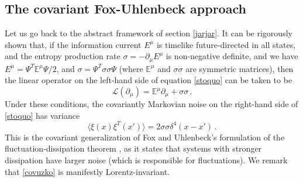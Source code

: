 \documentclass[aps,prd,preprint,nofootinbib,amsmath,amssymb,showpacs,longbibliography,singlecolumn,superscriptaddress,10pt]{revtex4-1}
\theoremstyle{plain}
\theoremstyle{definition}
\begin{document}
\subsection{The covariant Fox-Uhlenbeck approach}

Let us go back to the abstract framework of section \ref{jarjar}. It can be rigorously shown \cite{Gavassino:2023odx,Gavassino:2023qwl} that, if the information current $E^\mu$ is timelike future-directed in all states, and the entropy production rate $\sigma=-\partial_\mu E^\mu$ is non-negative definite, and we have $E^\mu = \Psi^T \mathbb{E}^\mu \Psi/2$, and $\sigma=\Psi^T \sigma \! \! \! \sigma \Psi$ (where $\mathbb{E}^\mu$ and $\sigma \! \! \! \sigma$ are symmetric matrices), then the linear operator on the left-hand side of equation \eqref{stoquo} can be taken to be 
\begin{equation}
   \mathcal{L}(\partial_\mu)=\mathbb{E}^\mu \partial_\mu + \sigma \! \! \! \sigma \, . 
\end{equation}
Under these conditions, the covariantly Markovian noise on the right-hand side of \eqref{stoquo} has variance \cite{Mullins:2023tjg, Mullins:2023ott}
\begin{equation}\label{covuzko}
    \langle \xi(x) \xi^T(x')\rangle = 2 \sigma \! \! \! \sigma \delta^4(x-x') \, .
\end{equation}
This is the covariant generalization of Fox and Uhlenbeck's formulation of the fluctuation-dissipation theorem \cite{fox1970contributions}, as it states that systems with stronger dissipation have larger noise (which is responsible for fluctuations). We remark that \eqref{covuzko} is manifestly Lorentz-invariant. 
\end{document}
